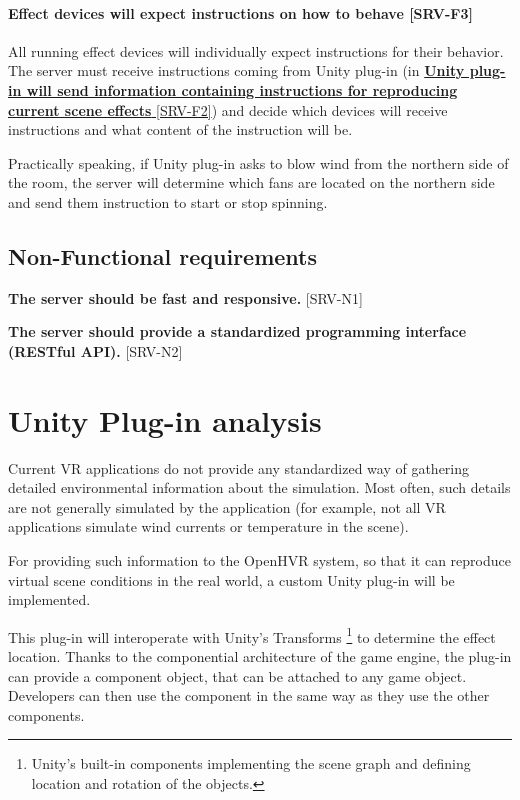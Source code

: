 \hypertarget{x-\textbf{effect-devices-will-expect-instructions-on-how-to-behave}-[srv-f3]}{\paragraph*{\textbf{Effect devices will expect instructions on how to behave} [SRV-F3]}}
All running effect devices will individually expect instructions for their
behavior. The server must receive instructions coming from Unity plug-in (in \hyperlink{srv-f2}{\textbf{Unity plug-in will send information containing instructions for reproducing current scene effects} [SRV-F2]})
and decide which devices will receive instructions and what content of the
instruction will be.


Practically speaking, if Unity plug-in asks to blow wind from the northern side of
the room, the server will determine which fans are located on the northern side
and send them instruction to start or stop spinning.


\hypertarget{x-non-functional-requirements}{\subsection{Non-Functional requirements}}
\textbf{The server should be fast and responsive.} [SRV-N1]


\textbf{The server should provide a standardized programming interface (RESTful API).} [SRV-N2]


\hypertarget{x-unity-plug-in-analysis}{\section{Unity Plug-in analysis}}
Current VR applications do not provide any standardized way
of gathering detailed environmental information about the simulation.
Most often, such details are not generally simulated by the application
(for example, not all VR applications simulate wind currents or
temperature in the scene).


For providing such information to the OpenHVR system, so that it can
reproduce virtual scene conditions in the real world, a custom Unity plug-in
will be implemented.


This plug-in will interoperate with Unity’s Transforms
\footnote{Unity’s built-in components implementing the scene graph and defining location and rotation of the objects.}
to determine the effect location. Thanks to the
componential architecture of the game engine, the plug-in can provide
a component object, that can be attached to any game object.
Developers can then use the component in the same way as they use the other
components.


